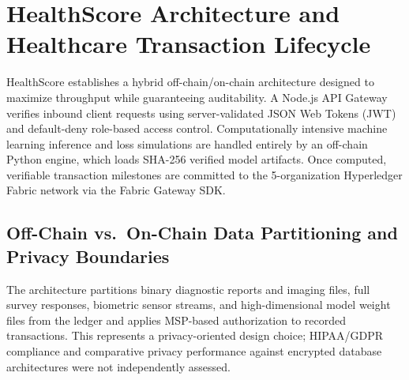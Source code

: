 \documentclass[runningheads]{llncs}
\begin{document}
\section{HealthScore Architecture and Healthcare Transaction Lifecycle}
HealthScore establishes a hybrid off-chain/on-chain architecture designed to maximize throughput while guaranteeing auditability. A Node.js API Gateway verifies inbound client requests using server-validated JSON Web Tokens (JWT) and default-deny role-based access control. Computationally intensive machine learning inference and loss simulations are handled entirely by an off-chain Python engine, which loads SHA-256 verified model artifacts. Once computed, verifiable transaction milestones are committed to the 5-organization Hyperledger Fabric network via the Fabric Gateway SDK.

\subsection{Off-Chain vs.\ On-Chain Data Partitioning and Privacy Boundaries}
The architecture partitions binary diagnostic reports and imaging files, full survey responses, biometric sensor streams, and high-dimensional model weight files from the ledger and applies MSP-based authorization to recorded transactions. This represents a privacy-oriented design choice; HIPAA/GDPR compliance and comparative privacy performance against encrypted database architectures were not independently assessed.
\end{document}
